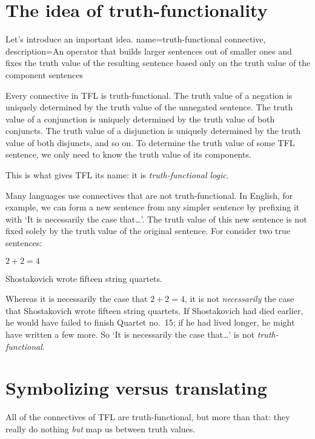 \section{The idea of truth-functionality}
Let's introduce an important idea.
{
name=truth-functional connective,
description={An operator that builds larger sentences out of smaller ones and fixes the \gls{truth value} of the resulting sentence based only on the truth value of the component sentences}
}
        
Every connective in TFL is truth-functional. The truth value of a negation is uniquely determined by the truth value of the unnegated sentence. The truth value of a conjunction is uniquely determined by the truth value of both conjuncts. The truth value of a disjunction is uniquely determined by the truth value of both disjuncts, and so on. To determine the truth value of some TFL sentence, we only need to know the truth value of its components.

This is what gives TFL its name: it is \emph{truth-functional logic}.

Many languages use connectives that are not truth-functional. In English, for example, we can form a new sentence from any simpler sentence by prefixing it with `It is necessarily the case that\ldots'. The truth value of this new sentence is not fixed solely by the truth value of the original sentence. For consider two true sentences:
	\begin{compactlist}
		\item $2 + 2 = 4$
		\item Shostakovich wrote fifteen string quartets.
	\end{compactlist}
Whereas it is necessarily the case that $2 + 2 = 4$, it is not \emph{necessarily} the case that Shostakovich wrote fifteen string quartets. If Shostakovich had died earlier, he would have failed to finish Quartet no.~15; if he had lived longer, he might have written a few more. So `It is necessarily the case that\ldots' is not \emph{truth-functional}.


\section{Symbolizing versus translating}
All of the connectives of TFL are truth-functional, but more than that: they really do nothing \emph{but} map us between truth values.  

